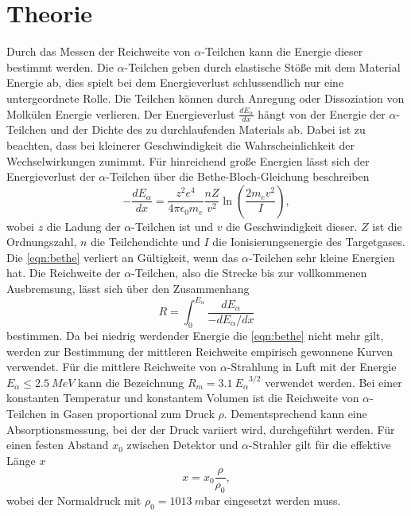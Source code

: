 \section[Theorie]{Theorie \textnormal{\cite{alpha}}}
\label{sec:theorie}

Durch das Messen der Reichweite von $\alpha$-Teilchen kann die Energie dieser bestimmt werden.
Die $\alpha$-Teilchen geben durch elastische Stöße mit dem Material Energie ab, dies spielt bei dem Energieverlust schlussendlich
nur eine untergeordnete Rolle. Die Teilchen können durch Anregung oder Dissoziation von Molkülen Energie verlieren.
Der Energieverlust $\frac{d E_\alpha}{d x}$ hängt von der Energie der $\alpha$-Teilchen und der Dichte des zu durchlaufenden 
Materials ab. Dabei ist zu beachten, dass bei kleinerer Geschwindigkeit die Wahrscheinlichkeit der Wechselwirkungen zunimmt.
Für hinreichend große Energien lässt sich der Energieverlust der $\alpha$-Teilchen über die Bethe-Bloch-Gleichung beschreiben 
\begin{equation}
    -\frac{d E_\alpha}{d x}=\frac{z^2 e^4}{4 \pi \epsilon_0 m_e} \frac{n Z}{v^2} \ln \left(\frac{2 m_e v^2}{I}\right),
    \label{eqn:bethe}
\end{equation}
wobei $z$ die Ladung der $\alpha$-Teilchen ist und $v$ die Geschwindigkeit dieser. $Z$ ist die Ordnungszahl, $n$ die Teilchendichte 
und $I$ die Ionisierungsenergie des Targetgases. Die \autoref{eqn:bethe} verliert an Gültigkeit, wenn das $\alpha$-Teilchen sehr 
kleine Energien hat.
Die Reichweite der $\alpha$-Teilchen, also die Strecke bis zur vollkommenen Ausbremsung, lässt sich über den Zusammenhang
\begin{equation}
    R=\int_0^{E_\alpha} \frac{d E_\alpha}{-d E_\alpha / d x}
    \label{eqn:reichweite}
\end{equation}
bestimmen.
Da bei niedrig werdender Energie die \autoref{eqn:bethe} nicht mehr gilt, werden zur Bestimmung der mittleren Reichweite
empirisch gewonnene Kurven verwendet. Für die mittlere Reichweite von $\alpha$-Strahlung in Luft mit der Energie $E_{\alpha} \leq \SI{2.5}{MeV}$
kann die Bezeichnung $R_m = \SI{3.1} {E_{\alpha}}^{3/2}$ verwendet werden.
Bei einer konstanten Temperatur und konstantem Volumen ist die Reichweite von $\alpha$-Teilchen in Gasen proportional zum Druck $\rho$.
Dementsprechend kann eine Absorptionsmessung, bei der der Druck variiert wird, durchgeführt werden. Für einen festen
Abstand $x_0$ zwischen Detektor und $\alpha$-Strahler gilt für die effektive Länge $x$ 
\begin{equation}
    x = x_0 \frac{\rho}{\rho_0},
	\label{eqn:effektiv}
\end{equation}
wobei der Normaldruck mit $\rho_0 = \SI{1013}{m\bar}$ eingesetzt werden muss.

